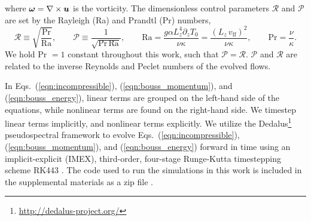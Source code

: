 where $\bm{\omega} = \nabla \times \bm{u}$ is the vorticity.
The dimensionless control parameters $\mathcal{R}$ and $\mathcal{P}$ 
are set by the Rayleigh (Ra) and Prandtl (Pr) numbers,
\begin{equation}
\mathcal{R} \equiv \sqrt{\frac{\text{Pr}}{\text{Ra}}}, \qquad \mathcal{P} \equiv \frac{1}{\sqrt{\text{Pr}\,\text{Ra}}}, \qquad
\text{Ra} = \frac{g \alpha L_z^4 \partial_z T_0}{\nu\kappa} = \frac{(L_z\,v_{\text{ff}})^2}{\nu\kappa}, \qquad \text{Pr} = \frac{\nu}{\kappa}.
\end{equation}
We hold Pr $= 1$ constant throughout this work, such that $\mathcal{P} = \mathcal{R}$.
$\mathcal{P}$ and $\mathcal{R}$ are related to the inverse Reynolds and Peclet numbers of the
evolved flows.

In Eqs.~(\ref{eqn:incompressible}), (\ref{eqn:bouss_momentum}), and (\ref{eqn:bouss_energy}),
linear terms are grouped on the left-hand side of the equations, while nonlinear terms
are found on the right-hand side. We timestep linear terms implicitly, and nonlinear
terms explicitly.
We utilize the 
Dedalus\footnote{\url{http://dedalus-project.org/}} 
pseudospectral framework \cite{burns&all2016} to evolve  
Eqs.~(\ref{eqn:incompressible}), (\ref{eqn:bouss_momentum}), and (\ref{eqn:bouss_energy}) 
forward in time
using an implicit-explicit (IMEX), third-order, four-stage 
Runge-Kutta timestepping scheme RK443 \cite{ascher&all1997}. The code used to run the simulations
in this work is included in the supplemental materials as a zip file \cite{supp}.

